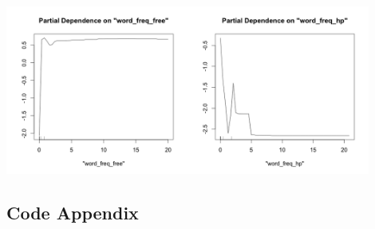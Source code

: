 \documentclass[12pt]{article}
\begin{document}
\begin{enumerate}[(a)]
\begin{enumerate}[1.]
\includegraphics[width=0.9\textwidth]{partialDep.png}
\end{enumerate}
\end{enumerate}

\newpage
\subsection*{Code Appendix}
\end{document}
